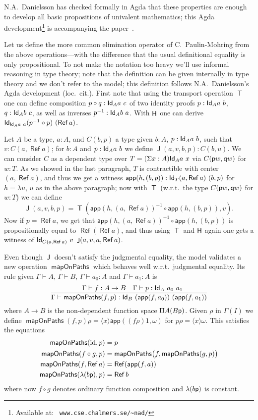 \documentclass[10pt,a4paper]{article}
\DeclareMathOperator{\Ref}{\mathsf{Ref}}
\DeclareMathOperator{\Transp}{\mathsf{T}}
\DeclareMathOperator{\HH}{{\sf H}}
\DeclareMathOperator{\Jel}{\mathsf{J}}
\newcommand{\Id}{{\sf Id}}
\newcommand{\app}{\mathsf{app}}
\newcommand{\pp}{{\sf p}}
\newcommand{\qq}{{\sf q}}
\newcommand{\bind}[2]{{\langle}#1{\rangle}#2}
\DeclareMathOperator{\mapOnPaths}{\mathsf{mapOnPaths}}
\begin{document}
N.A.~Danielsson has checked formally in Agda that these properties are
enough to develop all basic propositions of univalent mathematics;
this Agda development\footnote{Available at: {\tt
    www.cse.chalmers.se/\textasciitilde nad/}} is accompanying the
paper~\cite{CoquandDanielsson}.

Let us define the more common elimination operator of C.\
Paulin-Mohring from the above operations---with the difference that
the usual definitional equality is only propositional.  To not make
the notation too heavy we'll use informal reasoning in type theory;
note that the definition can be given internally in type theory and we
don't refer to the model; this definition follows N.A.\ Danielsson's
Agda development (loc.\ cit.).  First note that using the transport
operation $\Transp$ one can define composition $p \circ q : \Id_A a~c$
of two identity proofs $p : \Id_A a~b$, $q : \Id_A b~c$, as well as
inverses $p^{-1} : \Id_A b~a$.  With $\HH$ one can derive $\Id_{\Id_A
  a~a} (p^{-1} \circ p)~(\Ref a)$.

Let $A$ be a type, $a : A$, and $C (b,p)$ a type given $b : A$, $p :
\Id_A a~b$, such that $v : C (a, \Ref a)$; for $b : A$ and $p :
\Id_{A} a~b$ we define $\Jel (a,v,b,p) : C (b,u)$.  We can consider
$C$ as a dependent type over $T = (\Sigma x : A) \Id_A a~x$ via $C
(\pp w, \qq w)$ for $w : T$.  As we showed in the last paragraph, $T$
is contractible with center $(a, \Ref a)$, and thus we get a witness
$\app (h, (b,p)) : \Id_T (a,\Ref a)~(b,p)$ for $h = \lambda u$, $u$ as
in the above paragraph; now with $\Transp$ (w.r.t.\ the type $C (\pp
w, \qq w)$ for $w : T$) we can define
\[
\Jel (a,v,b,p) = \Transp (\app (h, (a,\Ref a))^{-1} \circ \app
(h,(b,p)), v).
\]
Now if $p = \Ref a$, we get that $\app (h, (a,\Ref a))^{-1} \circ \app
(h,(b,p))$ is propositionally equal to $\Ref (\Ref a)$, and thus using
$\Transp$ and $\HH$ again one gets a witness of $\Id_{C (a, \Ref a)}~
v~\Jel (a,v,a,\Ref a)$.

Even though $\Jel$ doesn't satisfy the judgmental equality, the model
validates a new operation $\mapOnPaths$ which behaves well w.r.t.\
judgmental equality.  Its rule given $\Gamma \vdash A$, $\Gamma \vdash
B$, $\Gamma \vdash a_0 : A$ and $\Gamma \vdash a_1 : A$ is
\[
\frac {\quad \Gamma \vdash f : A \to B \quad \Gamma \vdash p :
  \Id_A~a_0~a_1} {\Gamma \vdash \mapOnPaths (f, p) : \Id_B~(\app
  (f,a_0))~(\app (f,a_1))}
\]
where $A \to B$ is the non-dependent function space $\Pi A (B \pp)$.
Given $\rho$ in $\Gamma (I)$ we define $\mapOnPaths (f, p) \rho =
\bind{x} \app ((f \rho) 1, \omega)$ for $p \rho = \bind x \omega$.
This satisfies the equations
\begin{align*}
  \mapOnPaths (\mathrm{id}, p) & = p \\
  \mapOnPaths (f \circ g, p) &= \mapOnPaths \bigl( f, \mapOnPaths
  (g, p) \bigr)\\
  \mapOnPaths (f, \Ref a) &= \Ref (\app (f, a))\\
  \mapOnPaths (\lambda (b \pp), p) &= \Ref b
\end{align*}
where now $f \circ g$ denotes ordinary function composition and
$\lambda (b \pp)$ is constant.
\end{document}
